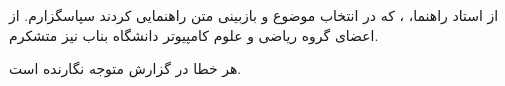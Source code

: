 
از استاد راهنما، \SupervisorNameFa، که در انتخاب موضوع و بازبینی متن راهنمایی کردند سپاسگزارم. از اعضای گروه ریاضی و علوم کامپیوتر دانشگاه بناب نیز متشکرم.

هر خطا در گزارش متوجه نگارنده است.
